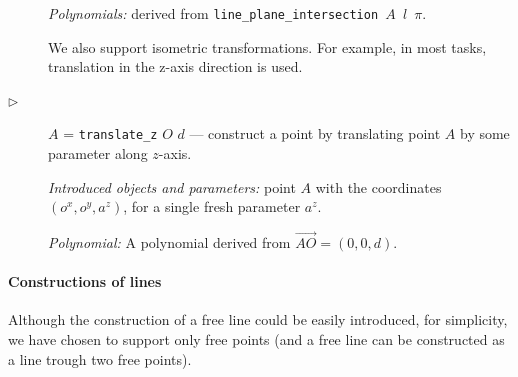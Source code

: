 \documentclass[final,1p,times,authoryear]{elsarticle}
\begin{document}
\begin{description}
  {\em Polynomials:} derived from {\tt line\_plane\_intersection $A$ $l$ $\pi$}.

\bigskip

We also support isometric transformations. For example, in most tasks,
translation in the z-axis direction is used.

\item[$\triangleright$]  $A$ = {\tt translate\_z} $O$ $d$ --- construct a
  point by translating point $A$ by some parameter along $z$-axis.

  {\em Introduced objects and parameters:} point $A$ with the
  coordinates $(o^x, o^y, a^z)$, for a single fresh parameter $a^z$.

  {\em Polynomial:} A polynomial derived from
  $\overrightarrow{AO} = (0, 0, d)$.
\end{description}


\paragraph{Constructions of lines}
Although the construction of a free line could be easily introduced,
for simplicity, we have chosen to support only free points (and a free
line can be constructed as a line trough two free points).
\end{document}
